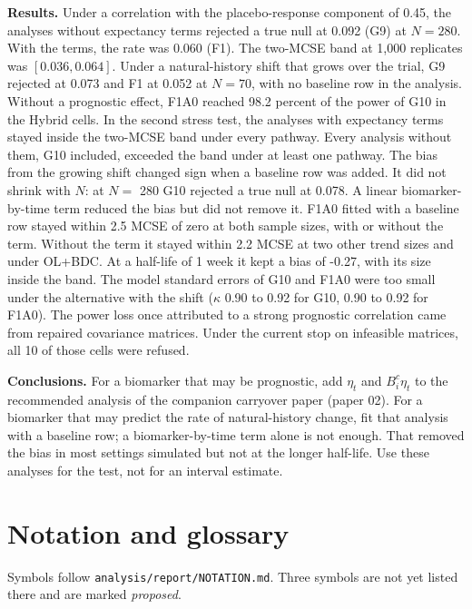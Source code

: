 \documentclass[
  11pt,
]{article}
\begin{document}
\textbf{Results.} Under a correlation with the placebo-response component
of 0.45, the analyses without expectancy terms rejected a true null at
0.092 (G9) at \(N = 280\). With the terms, the rate was
0.060 (F1). The two-MCSE band at 1,000 replicates
was \([0.036, 0.064]\).
Under a natural-history shift that grows over the trial, G9 rejected
at 0.073 and F1 at 0.052 at \(N = 70\), with no
baseline row in the analysis. Without a prognostic effect, F1A0
reached 98.2 percent of the power of G10 in the
Hybrid cells. In the second stress test, the analyses with expectancy
terms stayed inside the two-MCSE band under every pathway. Every
analysis without them, G10 included, exceeded the band under at least
one pathway. The bias from the growing shift changed sign when a
baseline row was added. It did not shrink with \(N\): at \(N =\)
280 G10 rejected a true null at 0.078. A
linear biomarker-by-time term reduced the bias but did not remove it.
F1A0 fitted with a baseline row stayed within 2.5 MCSE
of zero at both sample sizes, with or without the term. Without the
term it stayed within 2.2 MCSE at two other trend
sizes and under OL+BDC. At a half-life of 1 week it kept a bias of
-0.27, with its size inside the band. The model
standard errors of G10 and F1A0 were too small under the alternative
with the shift (\(\kappa\) 0.90 to 0.92 for G10, 0.90 to 0.92 for
F1A0).
The power loss once attributed to a strong
prognostic correlation came from repaired covariance matrices. Under
the current stop on infeasible matrices, all 10 of
those cells were refused.

\textbf{Conclusions.} For a biomarker that may be prognostic, add
\(\eta_t\) and \(B^c_i\eta_t\) to the recommended analysis of the
companion carryover paper (paper 02). For a biomarker that may predict
the rate of natural-history change, fit that analysis with a baseline
row; a biomarker-by-time term alone is not enough. That removed the
bias in most settings simulated but not at the longer half-life. Use
these analyses
for the test, not for an interval estimate.

\section*{Notation and glossary}\label{notation-and-glossary}

Symbols follow \texttt{analysis/report/NOTATION.md}. Three symbols are not
yet listed there and are marked \emph{proposed}.
\end{document}
